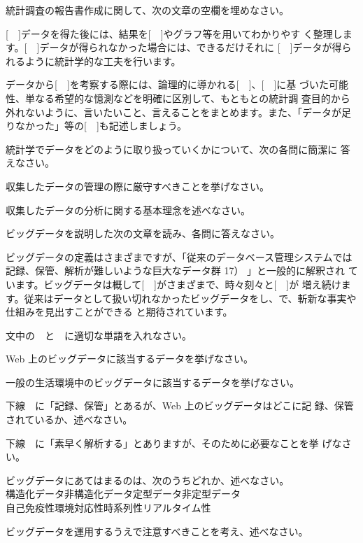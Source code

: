 \begin{exercise}
    \newpage
    
    \item{}
    統計調査の報告書作成に関して、次の文章の空欄を埋めなさい。
    
    [~~]データを得た後には、結果を[~~]やグラフ等を用いてわかりやす く整理します。[~~]データが得られなかった場合には、できるだけそれに [~~]データが得られるように統計学的な工夫を行います。
    
    データから[~~]を考察する際には、論理的に導かれる[~~]、[~~]に基 づいた可能性、単なる希望的な憶測などを明確に区別して、もともとの統計調 査目的から外れないように、言いたいこと、言えることをまとめます。また、「データが足りなかった」等の[~~]も記述しましょう。
    
    \item{}
    統計学でデータをどのように取り扱っていくかについて、次の各問に簡潔に 答えなさい。
    \begin{exenum}
        \item 収集したデータの管理の際に厳守すべきことを挙げなさい。
        \item 収集したデータの分析に関する基本理念を述べなさい。
    \end{exenum}
    
    \item{}
    ビッグデータを説明した次の文章を読み、各問に答えなさい。
    
    ビッグデータの定義はさまざまですが、「従来のデータベース管理システムでは記録、保管、解析が難しいような巨大なデータ群 17） 」と一般的に解釈され ています。ビッグデータは概して[~~]がさまざまで、時々刻々と[~~]が 増え続けます。従来はデータとして扱い切れなかったビッグデータをし、で、斬新な事実や仕組みを見出すことができる と期待されています。
    \begin{exenum}
        \item 文中の~~と~~に適切な単語を入れなさい。
        \item Web 上のビッグデータに該当するデータを挙げなさい。
        \item 一般の生活環境中のビッグデータに該当するデータを挙げなさい。 \item 下線~~に「記録、保管」とあるが、Web 上のビッグデータはどこに記 録、保管されているか、述べなさい。 
        \item 下線~~に「素早く解析する」とありますが、そのために必要なことを挙 げなさい。 
        \item ビッグデータにあてはまるのは、次のうちどれか、述べなさい。\\
         構造化データ\qquad 非構造化データ\qquad 定型データ\qquad 非定型データ\\
         自己免疫性\qquad 環境対応性\qquad 時系列性\qquad リアルタイム性
        \item ビッグデータを運用するうえで注意すべきことを考え、述べなさい。
    \end{exenum}
    

\end{exercise}

